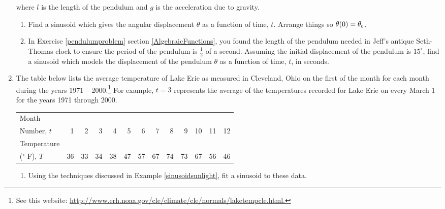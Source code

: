\begin{enumerate}
where $l$ is the length of the pendulum and $g$ is the acceleration due to gravity.

\begin{enumerate}

\item  Find a sinusoid which gives the angular displacement $\theta$ as a function of time, $t$. Arrange things so $\theta(0) = \theta_{\text{\tiny $0$}}$.

\item  In Exercise \ref{pendulumproblem} section \ref{AlgebraicFunctions}, you found the length of the pendulum needed in Jeff's antique Seth-Thomas clock to ensure the period of the pendulum is $\frac{1}{2}$ of a second. Assuming the initial displacement of the pendulum is $15^{\circ}$, find a sinusoid which models the displacement of the pendulum $\theta$ as a function of time, $t$, in seconds. 

\end{enumerate}


\item  The table below lists the average temperature of Lake Erie as measured in Cleveland, Ohio on the first of the month for each month during the years 1971 -- 2000.\footnote{See this website: \href{http://www.erh.noaa.gov/cle/climate/cle/normals/laketempcle.html}{\underline{http://www.erh.noaa.gov/cle/climate/cle/normals/laketempcle.html}.}}  For example,   $t=3$ represents the average of the temperatures recorded for Lake Erie on every March 1 for the years 1971 through 2000.

\medskip

\small

\noindent \begin{tabular}{|l|r|r|r|r|r|r|r|r|r|r|r|r|} \hline
Month  & & & & & & & & & & & & \\
Number, $t$ & 1 & 2 & 3 & 4 & 5 & 6 & 7 & 8 & 9 & 10 & 11 & 12\\ 
\hline 
Temperature  & & & & & & & & & & & & \\
($^{\circ}$ F), $T$ & 36 & 33 & 34 & 38 & 47 & 57 & 67 & 74 & 73 & 67 & 56 & 46 \\ \hline
\end{tabular}

\normalsize

\medskip

\begin{enumerate}

\item \label{LakeErieTempData} Using the techniques discussed in Example \ref{sinusoidsunlight}, fit a sinusoid to these data. 


\end{enumerate}
\end{enumerate}
